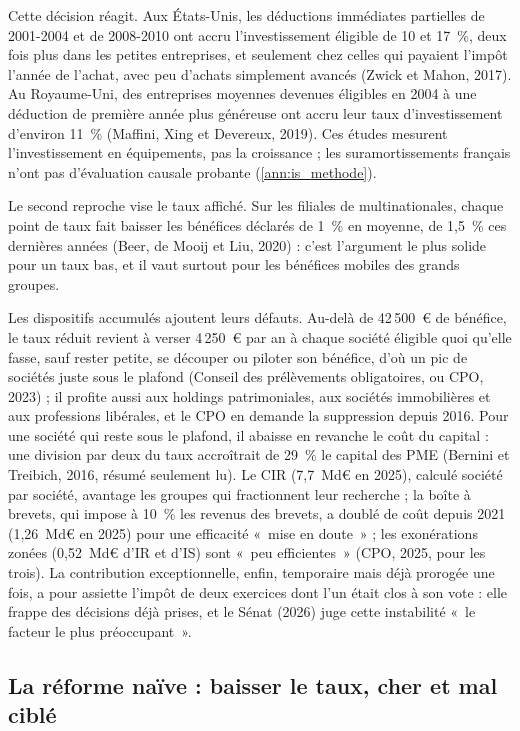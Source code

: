Cette décision réagit. Aux États-Unis, les déductions immédiates partielles de 2001-2004 et de 2008-2010 ont accru
l'investissement éligible de 10 et 17~\%, deux fois plus dans les petites entreprises, et seulement chez celles qui
payaient l'impôt l'année de l'achat, avec peu d'achats simplement avancés (Zwick et Mahon, 2017). Au Royaume-Uni, des
entreprises moyennes devenues éligibles en 2004 à une déduction de première année plus généreuse ont accru leur taux
d'investissement d'environ 11~\% (Maffini, Xing et Devereux, 2019). Ces études mesurent l'investissement en
équipements, pas la croissance ; les suramortissements français n'ont pas d'évaluation causale probante
(\ref{ann:is_methode}).

Le second reproche vise le taux affiché. Sur les filiales de multinationales, chaque point de taux fait baisser les
bénéfices déclarés de 1~\% en moyenne, de 1,5~\% ces dernières années (Beer, de Mooij et Liu, 2020) : c'est l'argument
le plus solide pour un taux bas, et il vaut surtout pour les bénéfices mobiles des grands groupes.

Les dispositifs accumulés ajoutent leurs défauts. Au-delà de 42\,500~€ de bénéfice, le taux réduit revient à verser
4\,250~€ par an à chaque société éligible quoi qu'elle fasse, sauf rester petite, se découper ou piloter son bénéfice,
d'où un pic de sociétés juste sous le plafond (Conseil des prélèvements obligatoires, ou CPO, 2023) ; il profite aussi
aux holdings patrimoniales, aux sociétés immobilières et aux professions libérales, et le CPO en demande la suppression
depuis 2016. Pour une société qui reste sous le plafond, il abaisse en revanche le coût du capital : une division par
deux du taux accroîtrait de 29~\% le capital des PME (Bernini et Treibich, 2016, résumé seulement lu). Le CIR (7,7~Md€
en 2025), calculé société par société, avantage les groupes qui fractionnent leur recherche ; la boîte à brevets, qui
impose à 10~\% les revenus des brevets, a doublé de coût depuis 2021 (1,26~Md€ en 2025) pour une efficacité «~mise en
doute~» ; les exonérations zonées (0,52~Md€ d'IR et d'IS) sont «~peu efficientes~» (CPO, 2025, pour les trois). La
contribution exceptionnelle, enfin, temporaire mais déjà prorogée une fois, a pour assiette l'impôt de deux exercices
dont l'un était clos à son vote : elle frappe des décisions déjà prises, et le Sénat (2026) juge cette instabilité
«~le facteur le plus préoccupant~».

\subsection{La réforme naïve : baisser le taux, cher et mal ciblé}\label{sec:is_naif}

